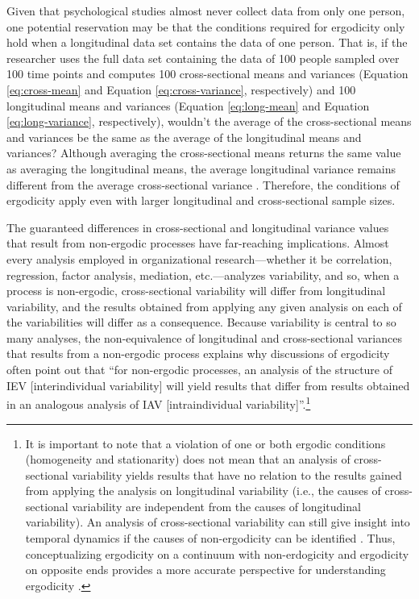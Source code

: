 \documentclass[
12pt, %
twoside,
english]{guelphthesis}
\begin{document}
Given that psychological studies almost never collect data from only one person, one potential reservation may be that the conditions required for ergodicity only hold when a longitudinal data set contains the data of one person. That is, if the researcher uses the full data set containing the data of 100 people sampled over 100 time points and computes 100 cross-sectional means and variances (Equation \ref{eq:cross-mean} and Equation \ref{eq:cross-variance}, respectively) and 100 longitudinal means and variances (Equation \ref{eq:long-mean} and Equation \ref{eq:long-variance}, respectively), wouldn't the average of the cross-sectional means and variances be the same as the average of the longitudinal means and variances? Although averaging the cross-sectional means returns the same value as averaging the longitudinal means, the average longitudinal variance remains different from the average cross-sectional variance \autocite[for several empirical examples, see][]{fisher2018}. Therefore, the conditions of ergodicity apply even with larger longitudinal and cross-sectional sample sizes.

The guaranteed differences in cross-sectional and longitudinal variance values that result from non-ergodic processes have far-reaching implications. Almost every analysis employed in organizational research---whether it be correlation, regression, factor analysis, mediation, etc.---analyzes variability, and so, when a process is non-ergodic, cross-sectional variability will differ from longitudinal variability, and the results obtained from applying any given analysis on each of the variabilities will differ as a consequence. Because variability is central to so many analyses, the non-equivalence of longitudinal and cross-sectional variances that results from a non-ergodic process explains why discussions of ergodicity often point out that ``for non-ergodic processes, an analysis of the structure of IEV {[}interindividual variability{]} will yield results that differ from results obtained in an analogous analysis of IAV {[}intraindividual variability{]}''\autocite[p.~202]{molenaar2004}.\footnote{It is important to note that a violation of one or both ergodic conditions (homogeneity and stationarity) does not mean that an analysis of cross-sectional variability yields results that have no relation to the results gained from applying the analysis on longitudinal variability (i.e., the causes of cross-sectional variability are independent from the causes of longitudinal variability). An analysis of cross-sectional variability can still give insight into temporal dynamics if the causes of non-ergodicity can be identified \parencites{voelkle2014}[for similar discussion, see][]{spector2019}. Thus, conceptualizing ergodicity on a continuum with non-erdogicity and ergodicity on opposite ends provides a more accurate perspective for understanding ergodicity \parencites{adolf2019}{medaglia2019}.}
\end{document}
